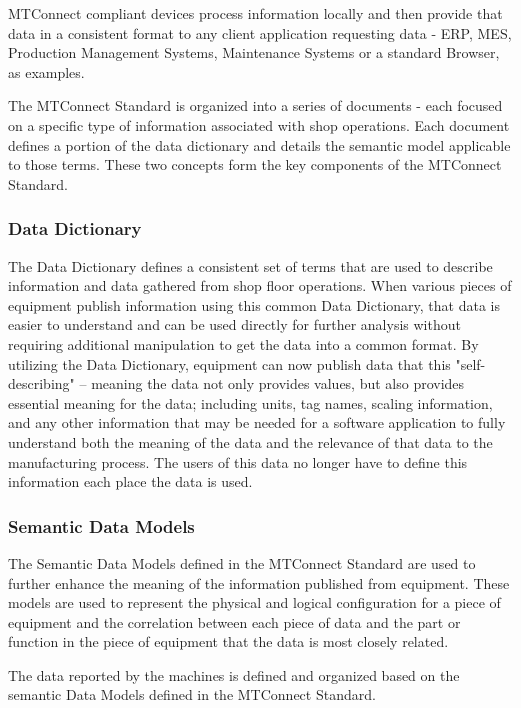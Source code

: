 MTConnect compliant devices process information locally and then provide that data in a consistent format to any client application requesting data - ERP, MES, Production Management Systems, Maintenance Systems or a standard Browser, as examples.

The MTConnect Standard is organized into a series of documents - each focused on a specific type of information associated with shop operations.   Each document defines a portion of the data dictionary and details the semantic model applicable to those terms.   These two concepts form the key components of the MTConnect Standard. 

\subsubsection{Data Dictionary}

The Data Dictionary defines a consistent set of terms that are used to describe information and data gathered from shop floor operations.   When various pieces of equipment publish information using this common Data Dictionary, that data is easier to understand and can be used directly for further analysis without requiring additional manipulation to get the data into a common format.  By utilizing the Data Dictionary, equipment can now publish data that this "self-describing" – meaning the data not only provides values, but also provides essential meaning for the data; including units, tag names, scaling information, and any other information that may be needed for a software application to fully understand both the meaning of the data and the relevance of that data to the manufacturing process.    The users of this data no longer have to define this information each place the data is used. 

\subsubsection{Semantic Data Models}
The Semantic Data Models defined in the MTConnect Standard are used to further enhance the meaning of the information published from equipment.  These models are used to represent the physical and logical configuration for a piece of equipment and the correlation between each piece of data and the part or function in the piece of equipment that the data is most closely related.   

The data reported by the machines is defined and organized based on the semantic Data Models defined in the MTConnect Standard.   

